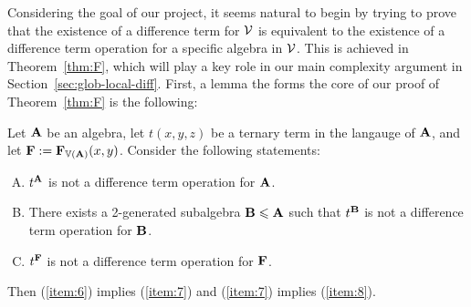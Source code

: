 Considering the goal of our project, it seems natural
to begin by trying to prove that the existence of a difference term for
 $\mathcal{V}$ is equivalent to the  existence  of a difference term
operation for a specific algebra in $\mathcal{V}$.  This is achieved in
Theorem~\ref{thm:F}, which will play a key role
in our main complexity argument in Section~\ref{sec:glob-local-diff}.
First, a lemma the forms the core of our proof of 
Theorem~\ref{thm:F} is the following:

\begin{lemma}
  \label{lem:equiv-cond-exist-1}
  Let $\mathbf{A}$ be an algebra, let $t(x,y,z)$ be a ternary term in the langauge
  of $\mathbf{A}$, and let $\mathbf{F} := \mathbf{F}_{\operatorname{\mathbb{V}}(\mathbf{A})}(x,y)$. Consider the following statements:
  \begin{enumerate}[(A)]
  \item \label{item:6} $t^{\mathbf{A}}$ is not a difference term operation for $\mathbf{A}$.
  \item \label{item:7} There exists a 2-generated subalgebra $\mathbf{B} \leqslant \mathbf{A}$
    such that $t^{\mathbf{B}}$ is not a difference term operation for $\mathbf{B}$.
  \item \label{item:8} $t^{\mathbf{F}}$ is not a difference term operation for $\mathbf{F}$.
  \end{enumerate}
  Then (\ref{item:6}) implies (\ref{item:7}) and (\ref{item:7}) implies (\ref{item:8}).
\end{lemma}
